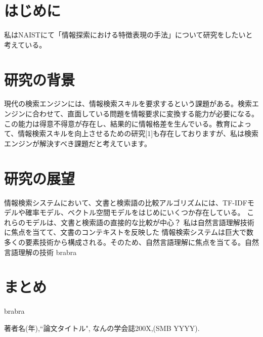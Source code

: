 \documentclass[a4j,10pt, twocolumn]{jarticle}
\begin{document}
\section{はじめに}
私はNAISTにて「情報探索における特徴表現の手法」について研究をしたいと考えている。
\section{研究の背景}
現代の検索エンジンには、情報検索スキルを要求するという課題がある。検索エンジンに合わせて、直面している問題を情報要求に変換する能力が必要になる。この能力は得意不得意が存在し、結果的に情報格差を生んでいる。教育によって、情報検索スキルを向上させるための研究[1]も存在しておりますが、私は検索エンジンが解決すべき課題だと考えています。
\section{研究の展望}
情報検索システムにおいて、文書と検索語の比較アルゴリズムには、TF-IDFモデルや確率モデル、ベクトル空間モデルをはじめにいくつか存在している。
これらのモデルは、文書と検索語の直接的な比較が中心？
私は自然言語理解技術に焦点を当てて、文書のコンテキストを反映した
情報検索システムは巨大で数多くの要素技術から構成される。そのため、自然言語理解に焦点を当てる。自然言語理解の技術
brabra
\section{まとめ}
brabra
\begin{thebibliography}{3}
 \label{takada}
著者名(年),``論文タイトル", なんの学会誌200X,(SMB YYYY).
\end{thebibliography}
\end{document}
